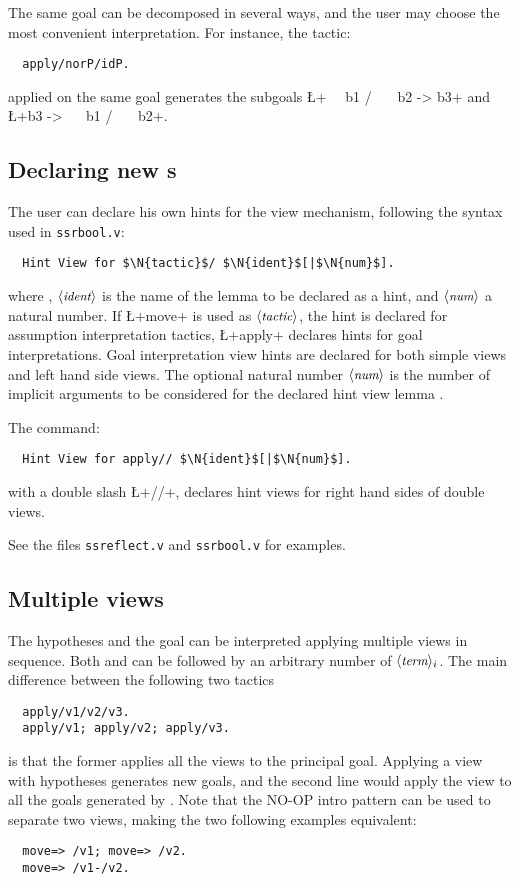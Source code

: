The same goal can be decomposed in several ways, and the user may
choose the most convenient interpretation. For instance, the tactic:
\begin{lstlisting}
  apply/norP/idP.
\end{lstlisting}
applied on the same goal  generates the subgoals
\L+~~  b1 /\ ~~  b2 -> b3+ and\\
\L+b3 -> ~~  b1 /\ ~~  b2+.


\subsection{Declaring new s}\label{ssec:vhints}

The user can declare his own hints for the view mechanism, following
the syntax used in {\tt ssrbool.v}:

\begin{lstlisting}
  Hint View for $\N{tactic}$/ $\N{ident}$[|$\N{num}$].
\end{lstlisting}
where , $\langle\mbox{\itshape\rmfamily\small ident}\rangle$ is the
name of the lemma to be declared as a hint, and $\langle\mbox{\itshape\rmfamily\small num}\rangle$ a natural
number. If \L+move+ is used as $\langle\mbox{\itshape\rmfamily\small tactic}\rangle$, the hint is declared for
assumption interpretation tactics, \L+apply+ declares hints for goal
interpretations.
Goal interpretation view hints are declared for both simple views and
left hand side views. The optional natural number $\langle\mbox{\itshape\rmfamily\small num}\rangle$ is the
number of implicit arguments to be considered for the declared hint
view lemma .

The command:
\begin{lstlisting}
  Hint View for apply// $\N{ident}$[|$\N{num}$].
\end{lstlisting}
with a double slash \L+//+, declares hint views for right hand sides of
double views.


\noindent See the files {\tt ssreflect.v} and {\tt ssrbool.v} for examples.

\subsection{Multiple views}\label{ssec:multiview}

The hypotheses and the goal can be interpreted applying multiple views in
sequence. Both  and  can be followed by an arbitrary number 
of \C{/}$\langle\mbox{\itshape\rmfamily\small term}\rangle_i$. The main difference between the following two tactics
\begin{lstlisting}
  apply/v1/v2/v3.
  apply/v1; apply/v2; apply/v3.
\end{lstlisting}
is that the former applies all the views to the principal goal. 
Applying a view with hypotheses generates new goals, and the second line
would apply the view  to all the goals generated by .
Note that the NO-OP intro pattern \C{-} can be used to separate two
views, making the two following examples equivalent:
\begin{lstlisting}
  move=> /v1; move=> /v2.
  move=> /v1-/v2.
\end{lstlisting}

